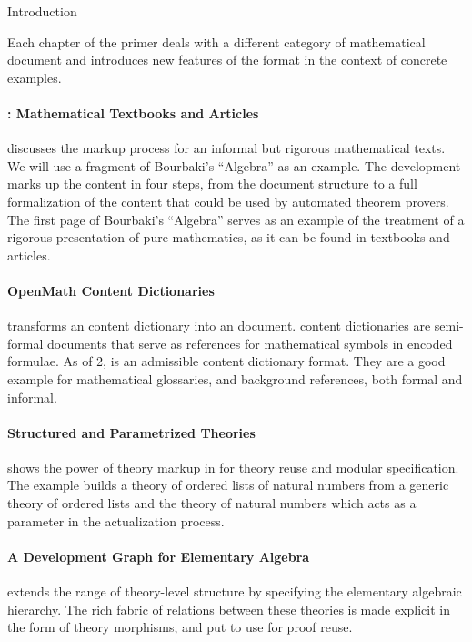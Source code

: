 \begin{omgroup}[id=intro]{Introduction}

Each chapter of the {\omdoc} primer deals with a different category of mathematical
document and introduces new features of the {\omdoc} format in the context of concrete
examples.

\paragraph{: Mathematical Textbooks and Articles} discusses the markup
process for an informal but rigorous mathematical texts.  We will use a fragment of
Bourbaki's ``Algebra'' as an example.  The development marks up the content in four steps,
from the document structure to a full formalization of the content that could be used by
automated theorem provers.  The first page of Bourbaki's ``Algebra'' serves as an example
of the treatment of a rigorous presentation of pure mathematics, as it can be found in
textbooks and articles.

\paragraph{ OpenMath Content Dictionaries} transforms an {\openmath}
content dictionary into an {\omdoc} document. {\openmath} content dictionaries are
semi-formal documents that serve as references for mathematical symbols in {\openmath}
encoded formulae.  As of {\openmath}2, {\omdoc} is an admissible {\openmath} content
dictionary format. They are a good example for mathematical glossaries, and background
references, both formal and informal.

\paragraph{ Structured and Parametrized Theories} shows the power of
theory markup in {\omdoc} for theory reuse and modular specification. The example builds a
theory of ordered lists of natural numbers from a generic theory of ordered lists and the
theory of natural numbers which acts as a parameter in the actualization process.

\paragraph{ A Development Graph for Elementary Algebra} extends the
range of theory-level structure by specifying the elementary algebraic hierarchy. The rich
fabric of relations between these theories is made explicit in the form of theory
morphisms, and put to use for proof reuse.


\end{omgroup}
